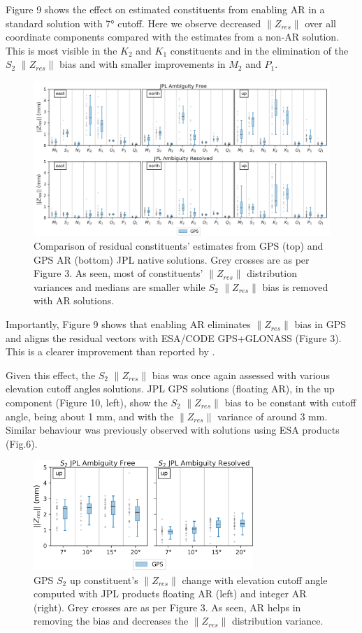 \documentclass[se, manuscript]{copernicus}
\begin{document}
Figure 9 shows the effect on estimated constituents from enabling AR in a standard solution with 7° cutoff. Here we observe decreased $\|Z_{res}\|$ over all coordinate components compared with the estimates from a non-AR solution. This is most visible in the $K_2$ and $K_1$ constituents and in the elimination of the $S_2$ $\|Z_{res}\|$ bias and with smaller improvements in $M_2$ and $P_1$.

\begin{figure}[t]
\includegraphics[width=17cm]{fig09.png}
\caption{Comparison of residual constituents’ estimates from GPS (top) and GPS AR (bottom) JPL native solutions. Grey crosses are as per Figure 3. As seen, most of constituents’ $\|Z_{res}\|$ distribution variances and medians are smaller while $S_2$ $\|Z_{res}\|$ bias is removed with AR solutions.}
\end{figure}

Importantly, Figure 9 shows that enabling AR eliminates $\|Z_{res}\|$ bias in GPS and aligns the residual vectors with ESA/CODE GPS+GLONASS (Figure 3). This is a clearer improvement than reported by \cite{Thomas2006}. 

Given this effect, the $S_2$ $\|Z_{res}\|$ bias was once again assessed with various elevation cutoff angles solutions. JPL GPS solutions (floating AR), in the up component (Figure 10, left), show the $S_2$ $\|Z_{res}\|$ bias to be constant with cutoff angle, being about 1 mm, and with the $\|Z_{res}\|$ variance of around 3 mm. Similar behaviour was previously observed with solutions using ESA products (Fig.6).

\begin{figure}[t]
\includegraphics[width=8.3cm]{fig10.png}
\caption{GPS $S_2$ up constituent’s $\|Z_{res}\|$ change with elevation cutoff angle computed with JPL products floating AR (left) and integer AR (right). Grey crosses are as per Figure 3. As seen, AR helps in removing the bias and  decreases the $\|Z_{res}\|$ distribution variance.}
\end{figure}
\end{document}
